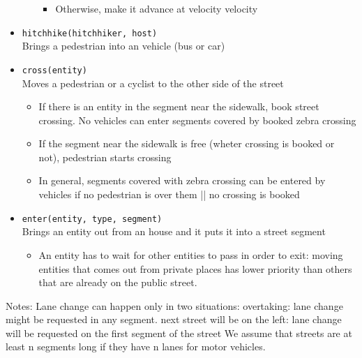 \begin{itemize}
\begin{itemize}
\begin{itemize}
			\item Otherwise, make it advance at velocity velocity
		\end{itemize}
	\end{itemize}
	\item \texttt{hitchhike(hitchhiker, host)}
	\\Brings a pedestrian into an vehicle (bus or car)
	\item \texttt{cross(entity)}
	\\Moves a pedestrian or a cyclist to the other side of the street	
	\begin{itemize}
		\item If there is an entity in the segment near the sidewalk, book street crossing. No vehicles can enter segments covered by booked zebra crossing
		\item If the segment near the sidewalk is free (wheter crossing is booked or not), pedestrian starts crossing
		\item In general, segments covered with zebra crossing can be entered by vehicles if no pedestrian is over them || no crossing is booked
	\end{itemize}
	\item \texttt{enter(entity, type, segment)}
	\\Brings an entity out from an house and it puts it into a street segment	
	\begin{itemize}
		\item An entity has to wait for other entities to pass in order to exit: moving entities that comes out from private places has lower priority than others that are already on the public street.
	\end{itemize}
\end{itemize}
Notes: 
Lane change can happen only in two situations:
overtaking: lane change might be requested in any segment.
next street will be on the left: lane change will be requested on the first segment of the street
We assume that streets are at least n segments long if they have n lanes for motor vehicles.